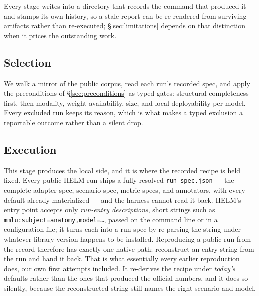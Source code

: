 Every stage writes into a directory that records the command that produced it and
stamps its own history, so a stale report can be re-rendered from surviving
artifacts rather than re-executed; \S\ref{sec:limitations} depends on that
distinction when it prices the outstanding work.

\subsection{Selection}
\label{sec:selection}

We walk a mirror of the public corpus, read each run's recorded spec, and apply
the preconditions of \S\ref{sec:preconditions} as typed gates: structural
completeness first, then modality, weight availability, size, and local
deployability per model. Every excluded run keeps its reason, which is what makes
a typed exclusion a reportable outcome rather than a silent drop.

\subsection{Execution}
\label{sec:fromspec}

This stage produces the local side, and it is where the recorded recipe is held
fixed. Every public HELM run ships a fully resolved \texttt{run\_spec.json} ---
the complete adapter spec, scenario spec, metric specs, and annotators, with every
default already materialized --- and the harness cannot read it back. HELM's
entry point accepts only \emph{run-entry descriptions}, short strings such as
\texttt{mmlu:subject=anatomy,model=\ldots}, passed on the command line or in a
configuration file; it turns each into a run spec by re-parsing the string under
whatever library version happens to be installed. Reproducing a public run from
the record therefore has exactly one native path: reconstruct an entry string
from the run and hand it back. That is what essentially every earlier
reproduction does, our own first attempts included. It re-derives the recipe
under \emph{today's} defaults rather than the ones that produced the official
numbers, and it does so silently, because the reconstructed string still names
the right scenario and model.

